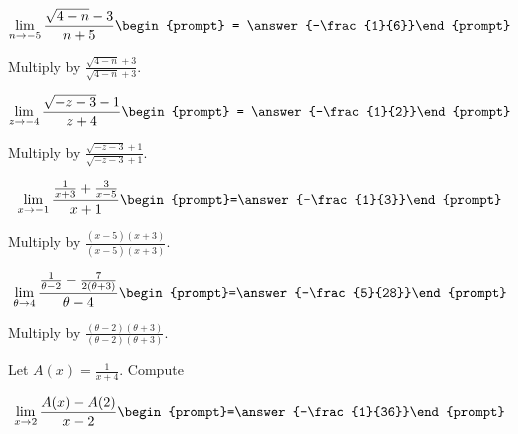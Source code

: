 \documentclass{ximera}
\begin{document}
\begin{exercise}

\[
\lim_{n\to -5 } \frac{\sqrt{4-n}-3}{n+5}\begin{prompt} = \answer{-\frac{1}{6}}\end{prompt}
\]
\begin{hint}
Multiply by $\frac{\sqrt{4-n}+3}{\sqrt{4-n}+3}$.
\end{hint}
\end{exercise}

\begin{exercise}

\[
\lim_{z\to -4 } \frac{\sqrt{-z-3}-1}{z+4}\begin{prompt} = \answer{-\frac{1}{2}}\end{prompt}
\]
\begin{hint}
Multiply by $\frac{\sqrt{-z-3}+1}{\sqrt{-z-3}+1}$.
\end{hint}
\end{exercise}


\begin{exercise}

\[
\lim_{x\to -1 } \frac{\frac{1}{x+3}+\frac{3}{x-5}}{x+1}  \begin{prompt}=\answer{-\frac{1}{3}}\end{prompt}
\]
\begin{hint}
Multiply by $\frac{(x-5) (x+3)}{(x-5) (x+3)}$.
\end{hint}
\end{exercise}

\begin{exercise}

\[
\lim_{\theta\to 4 } \frac{\frac{1}{\theta -2}-\frac{7}{2 (\theta +3)}}{\theta -4}  \begin{prompt}=\answer{-\frac{5}{28}}\end{prompt}
\]
\begin{hint}
Multiply by $\frac{(\theta -2) (\theta +3)}{(\theta -2) (\theta +3)}$.
\end{hint}
\end{exercise}

\begin{exercise}
Let $A(x) = \frac{1}{x +4}$. Compute

\[
\lim_{ x\to 2 } 
\frac{A(x)-A(2)}{x-2} \begin{prompt}=\answer{-\frac{1}{36}}\end{prompt}
\]
\end{exercise}
\end{document}
